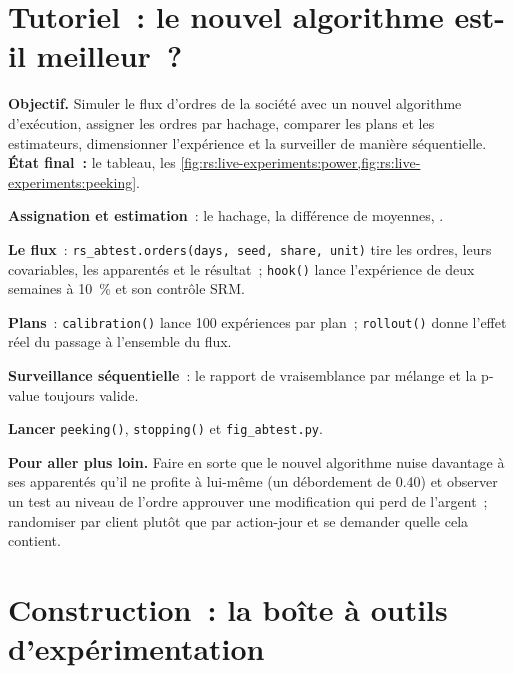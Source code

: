 \section{Tutoriel~: le nouvel algorithme est-il meilleur~?}\label{tut:rs:live-experiments:tut}

\begin{tutorial}
\textbf{Objectif.} Simuler le flux d'ordres de la société avec un nouvel algorithme d'exécution, assigner les ordres par hachage, comparer les plans et les estimateurs, dimensionner l'expérience et
la surveiller de manière séquentielle. \textbf{État final~:} le tableau, les \cref{fig:rs:live-experiments:power,fig:rs:live-experiments:peeking}.
\begin{tutsteps}
\item \textbf{Assignation et estimation}~: le hachage, la différence de moyennes, .
\label{lst:rs:live-experiments:assign}
\item \textbf{Le flux}~: \texttt{rs\_abtest.orders(days, seed, share, unit)} tire les ordres, leurs covariables, les apparentés et le résultat~; \texttt{hook()}
lance l'expérience de deux semaines à 10~\% et son contrôle SRM.
\item \textbf{Plans}~: \texttt{calibration()} lance 100 expériences par plan~; \texttt{rollout()} donne l'effet réel du passage à l'ensemble du flux.
\item \textbf{Surveillance séquentielle}~: le rapport de vraisemblance par mélange et la p-value toujours valide.
\label{lst:rs:live-experiments:msprt}
\item \textbf{Lancer} \texttt{peeking()}, \texttt{stopping()} et \texttt{fig\_abtest.py}.
\end{tutsteps}
\textbf{Pour aller plus loin.} Faire en sorte que le nouvel algorithme nuise davantage à ses apparentés qu'il ne profite à lui-même (un débordement de 0.40) et observer un test au niveau de l'ordre approuver une
modification qui perd de l'argent~; randomiser par client plutôt que par action-jour et se demander quelle  cela contient.
\end{tutorial}

\section{Construction~: la boîte à outils d'expérimentation}\label{bld:rs:live-experiments:abtest}

